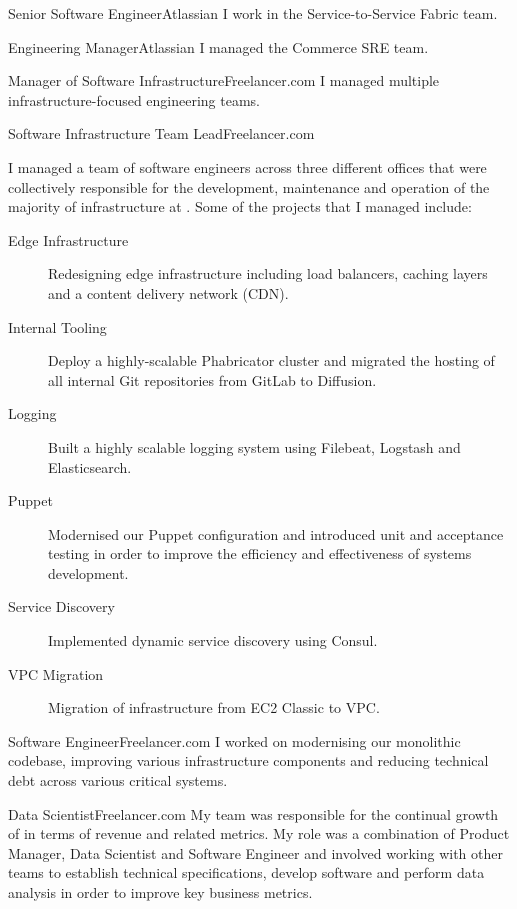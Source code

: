 \begin{professionalExperience}

{Senior Software Engineer}{Atlassian}
{I work in the Service-to-Service Fabric team.}

{Engineering Manager}{Atlassian}
{I managed the Commerce SRE team.}

{Manager of Software Infrastructure}{Freelancer.com}
{
  I managed multiple infrastructure-focused engineering teams.
}

{Software Infrastructure Team Lead}{Freelancer.com}
{
  I managed a team of software engineers across three different offices that were
  collectively responsible for the development, maintenance and operation of
  the majority of infrastructure at . Some of the
  projects that I managed include:

  \begin{description}
    \item[Edge Infrastructure] Redesigning edge infrastructure including load
      balancers, caching layers and a content delivery network (CDN).
    \item[Internal Tooling] Deploy a highly-scalable Phabricator cluster and
      migrated the hosting of all internal Git repositories from GitLab to
      Diffusion.
    \item[Logging] Built a highly scalable logging system using Filebeat,
      Logstash and Elasticsearch.
    \item[Puppet] Modernised our Puppet configuration and introduced unit and
      acceptance testing in order to improve the efficiency and effectiveness of
      systems development.
    \item[Service Discovery] Implemented dynamic service discovery using Consul.
    \item[VPC Migration] Migration of infrastructure from EC2 Classic to VPC\@.
  \end{description}
}







{Software Engineer}{Freelancer.com}
{
  I worked on modernising our monolithic codebase, improving various
  infrastructure components and reducing technical debt across various critical
  systems.
}

{Data Scientist}{Freelancer.com}
{
  My team was responsible for the continual growth of 
  in terms of revenue and related metrics. My role was a combination of Product
  Manager, Data Scientist and Software Engineer and involved working with other
  teams to establish technical specifications, develop software and perform data
  analysis in order to improve key business metrics.
}

\end{professionalExperience}
